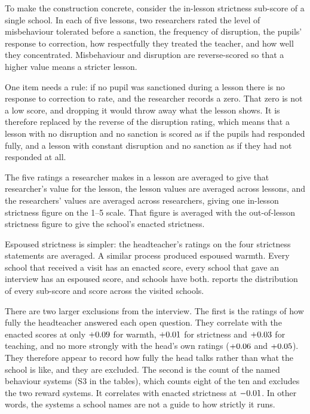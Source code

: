 To make the construction concrete, consider the in-lesson strictness
sub-score of a single school. In each of five lessons, two researchers rated
the level of misbehaviour tolerated before a sanction, the frequency of
disruption, the pupils' response to correction, how respectfully they treated
the teacher, and how well they concentrated. Misbehaviour and disruption are
reverse-scored so that a higher value means a stricter lesson.

One item needs a rule: if no pupil was sanctioned during a lesson there is no response
to correction to rate, and the researcher records a zero. That zero is not a
low score, and dropping it would throw away what the lesson shows. It is
therefore replaced by the reverse of the disruption rating, which means that
a lesson with no disruption and no sanction is scored as if the pupils had
responded fully, and a lesson with constant disruption and no sanction as if
they had not responded at all.

The five ratings a researcher makes in a
lesson are averaged to give that researcher's value for the lesson, the
lesson values are averaged
across lessons, and the researchers' values are averaged across researchers,
giving one in-lesson strictness figure on the 1--5 scale. That figure is averaged with the out-of-lesson strictness figure to give the school's enacted strictness.

Espoused strictness is
simpler: the headteacher's ratings on the four strictness statements are averaged. A similar process produced espoused warmth.
Every school that received a visit has an enacted
score, every school that gave an interview has an espoused score, and
\NTierOne{} schools have both.  reports the distribution
of every sub-score and score across the visited schools.



There are two larger exclusions from the interview. The first is the ratings of how fully the headteacher answered each open question. They correlate with the enacted scores at only $+0.09$ for warmth, $+0.01$ for strictness and $+0.03$ for teaching, and no more strongly with the head's own ratings ($+0.06$ and $+0.05$). They therefore appear to record how fully the head talks rather than what the school is like, and they are excluded. The second is the count of the named behaviour systems (S3 in the tables), which counts eight of the ten and excludes the two reward systems. It correlates with enacted strictness at $-0.01$. In other words, the systems a school names are not a guide to how strictly it runs.

